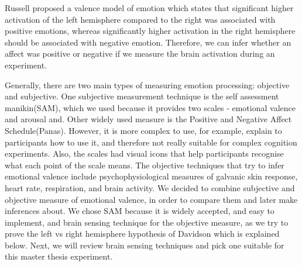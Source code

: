 \documentclass[a4paper]{report}
\begin{document}
		Russell\cite{russell2003core} proposed a valence model of emotion which states that significant higher activation of the left hemisphere compared to the right was associated with positive emotions, whereas significantly higher activation in the right hemisphere should be associated with negative emotion. Therefore, we can infer whether an affect was positive or negative if we measure the brain activation during an experiment.
		
		Generally, there are two main types of measuring emotion processing: objective and subjective. One subjective measurement technique is the self assessment manikin(SAM)\cite{bradley1994measuring}, which we used because it provides two scales - emotional valence and arousal and. Other widely used measure is the Positive and Negative Affect Schedule(Panas)\cite{watson1988development}. However, it is more complex to use, for example, explain to participants how to use it, and therefore not really suitable for complex cognition experiments. Also, the scales had visual icons that help participants recognise what each point of the scale means. The objective techniques that try to infer emotional valence include psychophysiological measures of galvanic skin response, heart rate, respiration\cite{krumhansl1997exploratory}, and brain activity\cite{Balconi201567}. We decided to combine subjective and objective measure of emotional valence, in order to compare them and later make inferences about. We chose SAM because it is widely accepted, and easy to implement, and brain sensing technique for the objective measure, as we try to prove the left vs right hemisphere hypothesis of Davidson\cite{davidson1992emotion} which is explained below. Next, we will review brain sensing techniques and pick one suitable for this master thesis experiment.
		
		
\end{document}
